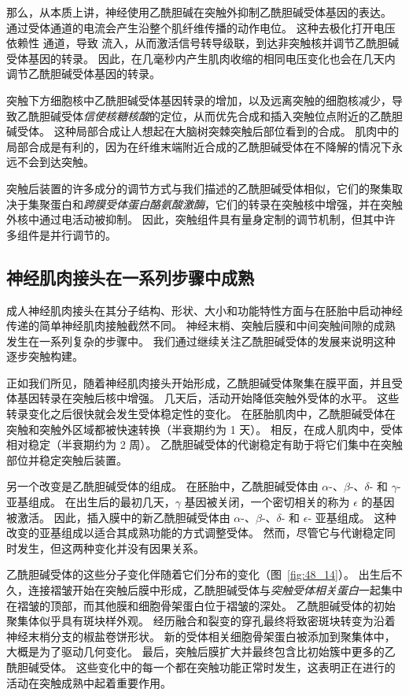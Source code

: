 那么，从本质上讲，神经使用乙酰胆碱在突触外抑制乙酰胆碱受体基因的表达。
通过受体通道的电流会产生沿整个肌纤维传播的动作电位。
这种去极化打开电压依赖性  通道，导致  流入，从而激活信号转导级联，到达非突触核并调节乙酰胆碱受体基因的转录。
因此，在几毫秒内产生肌肉收缩的相同电压变化也会在几天内调节乙酰胆碱受体基因的转录。


突触下方细胞核中乙酰胆碱受体基因转录的增加，以及远离突触的细胞核减少，导致乙酰胆碱受体\textit{信使核糖核酸}的定位，从而优先合成和插入突触位点附近的乙酰胆碱受体。
这种局部合成让人想起在大脑树突棘突触后部位看到的合成。
肌肉中的局部合成是有利的，因为在纤维末端附近合成的乙酰胆碱受体在不降解的情况下永远不会到达突触。


突触后装置的许多成分的调节方式与我们描述的乙酰胆碱受体相似，它们的聚集取决于集聚蛋白和\textit{跨膜受体蛋白酪氨酸激酶}，它们的转录在突触核中增强，并在突触外核中通过电活动被抑制。
因此，突触组件具有量身定制的调节机制，但其中许多组件是并行调节的。



\subsection{神经肌肉接头在一系列步骤中成熟}

成人神经肌肉接头在其分子结构、形状、大小和功能特性方面与在胚胎中启动神经传递的简单神经肌肉接触截然不同。
神经末梢、突触后膜和中间突触间隙的成熟发生在一系列复杂的步骤中。
我们通过继续关注乙酰胆碱受体的发展来说明这种逐步突触构建。


正如我们所见，随着神经肌肉接头开始形成，乙酰胆碱受体聚集在膜平面，并且受体基因转录在突触后核中增强。
几天后，活动开始降低突触外受体的水平。
这些转录变化之后很快就会发生受体稳定性的变化。
在胚胎肌肉中，乙酰胆碱受体在突触和突触外区域都被快速转换（半衰期约为 1 天）。
相反，在成人肌肉中，受体相对稳定（半衰期约为 2 周）。
乙酰胆碱受体的代谢稳定有助于将它们集中在突触部位并稳定突触后装置。


另一个改变是乙酰胆碱受体的组成。
在胚胎中，乙酰胆碱受体由 $ \alpha $-、$ \beta $-、$ \delta $- 和 $ \gamma $- 亚基组成。
在出生后的最初几天，$ \gamma $ 基因被关闭，一个密切相关的称为 $ \epsilon $ 的基因被激活。
因此，插入膜中的新乙酰胆碱受体由 $ \alpha $-、$ \beta $-、$ \delta $- 和 $ \epsilon $- 亚基组成。
这种改变的亚基组成以适合其成熟功能的方式调整受体。
然而，尽管它与代谢稳定同时发生，但这两种变化并没有因果关系。


乙酰胆碱受体的这些分子变化伴随着它们分布的变化（图~\ref{fig:48_14}）。
出生后不久，连接褶皱开始在突触后膜中形成，乙酰胆碱受体与\textit{突触受体相关蛋白}一起集中在褶皱的顶部，而其他膜和细胞骨架蛋白位于褶皱的深处。
乙酰胆碱受体的初始聚集体似乎具有斑块样外观。
经历融合和裂变的穿孔最终将致密斑块转变为沿着神经末梢分支的椒盐卷饼形状。
新的受体相关细胞骨架蛋白被添加到聚集体中，大概是为了驱动几何变化。
最后，突触后膜扩大并最终包含比初始簇中更多的乙酰胆碱受体。
这些变化中的每一个都在突触功能正常时发生，这表明正在进行的活动在突触成熟中起着重要作用。


